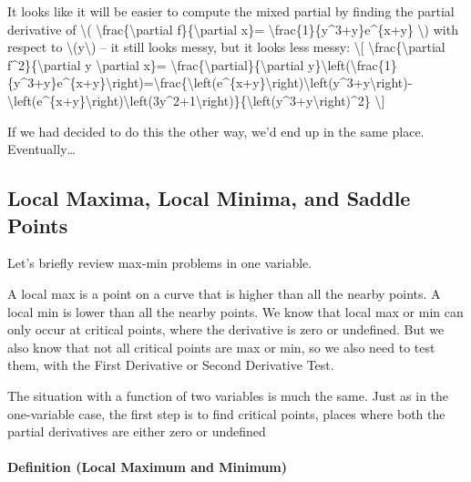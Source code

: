 It looks like it will be easier to compute the mixed partial by finding
the partial derivative of \textbackslash{}(
\textbackslash{}frac\{\textbackslash{}partial
f\}\{\textbackslash{}partial x\}=
\textbackslash{}frac\{1\}\{y\^{}3+y\}e\^{}\{x+y\} \textbackslash{}) with
respect to \textbackslash{}(y\textbackslash{}) -- it still looks messy,
but it looks less messy: \textbackslash{}{[}
\textbackslash{}frac\{\textbackslash{}partial
f\^{}2\}\{\textbackslash{}partial y \textbackslash{}partial x\}=
\textbackslash{}frac\{\textbackslash{}partial\}\{\textbackslash{}partial
y\}\textbackslash{}left(\textbackslash{}frac\{1\}\{y\^{}3+y\}e\^{}\{x+y\}\textbackslash{}right)=\textbackslash{}frac\{\textbackslash{}left(e\^{}\{x+y\}\textbackslash{}right)\textbackslash{}left(y\^{}3+y\textbackslash{}right)-\textbackslash{}left(e\^{}\{x+y\}\textbackslash{}right)\textbackslash{}left(3y\^{}2+1\textbackslash{}right)\}\{\textbackslash{}left(y\^{}3+y\textbackslash{}right)\^{}2\}
\textbackslash{}{]}

If we had decided to do this the other way, we'd end up in the same
place. Eventually\ldots{}

\hypertarget{local-maxima-local-minima-and-saddle-points}{%
\subsection{Local Maxima, Local Minima, and Saddle
Points}\label{local-maxima-local-minima-and-saddle-points}}

Let's briefly review max-min problems in one variable.

A local max is a point on a curve that is higher than all the nearby
points. A local min is lower than all the nearby points. We know that
local max or min can only occur at critical points, where the derivative
is zero or undefined. But we also know that not all critical points are
max or min, so we also need to test them, with the First Derivative or
Second Derivative Test.

The situation with a function of two variables is much the same. Just as
in the one-variable case, the first step is to find critical points,
places where both the partial derivatives are either zero or undefined

\hypertarget{definition-local-maximum-and-minimum}{%
\paragraph{Definition (Local Maximum and
Minimum)}\label{definition-local-maximum-and-minimum}}

